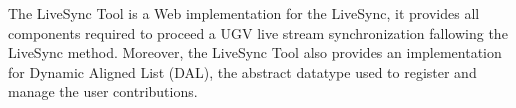 The LiveSync Tool is a Web implementation for the LiveSync, it provides all components required to proceed a  UGV live stream synchronization fallowing the LiveSync method. Moreover, the LiveSync Tool also provides an implementation for Dynamic Aligned List (DAL), the abstract datatype used to register and manage the user contributions.
